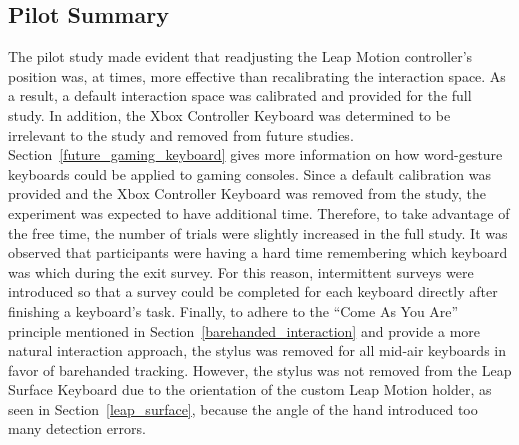\subsection{Pilot Summary} \label{pilot_summary}
The pilot study made evident that readjusting the Leap Motion controller's position was, at times, more effective than recalibrating the interaction space. As a result, a default interaction space was calibrated and provided for the full study. In addition, the Xbox Controller Keyboard was determined to be irrelevant to the study and removed from future studies. Section~\ref{future_gaming_keyboard} gives more information on how word-gesture keyboards could be applied to gaming consoles. Since a default calibration was provided and the Xbox Controller Keyboard was removed from the study, the experiment was expected to have additional time. Therefore, to take advantage of the free time, the number of trials were slightly increased in the full study. It was observed that participants were having a hard time remembering which keyboard was which during the exit survey. For this reason, intermittent surveys were introduced so that a survey could be completed for each keyboard directly after finishing a keyboard's task. Finally, to adhere to the ``Come As You Are'' principle mentioned in Section~\ref{barehanded_interaction} and provide a more natural interaction approach, the stylus was removed for all mid-air keyboards in favor of barehanded tracking. However, the stylus was not removed from the Leap Surface Keyboard due to the orientation of the custom Leap Motion holder, as seen in Section~\ref{leap_surface}, because the angle of the hand introduced too many detection errors.
